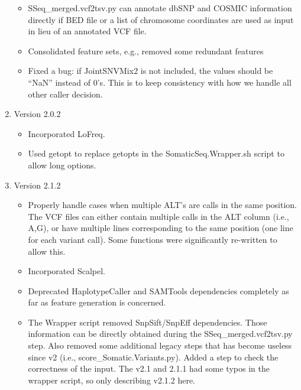 \documentclass[10pt,letterpaper]{article}
\begin{document}
\begin{sloppypar}
\begin{enumerate}
\begin{itemize}
		  \item
		  SSeq\_merged.vcf2tsv.py can annotate dbSNP and COSMIC information directly if BED file or a list of chromosome coordinates are used as input in lieu of an annotated VCF file. 
		
		  \item
		  Consolidated feature sets, e.g., removed some redundant features
		  
		  \item
		  Fixed a bug: if JointSNVMix2 is not included, the values should be ``NaN'' instead of 0's. This is to keep consistency with how we handle all other caller decision.
		\end{itemize}
	
	
	
	\item Version 2.0.2
	
		\begin{itemize}
		
		  \item
		  Incorporated LoFreq.
		  
		  \item
		  Used getopt to replace getopts in the SomaticSeq.Wrapper.sh script to allow long options. 
		  
		\end{itemize}
	
	
	
	\item Version 2.1.2
	
	\begin{itemize}
	
	  \item
	  Properly handle cases when multiple ALT's are calls in the same position. The VCF files can either contain multiple calls in the ALT column (i.e., A,G), or have multiple lines corresponding to the same position (one line for each variant call). Some functions were significantly re-written to allow this.
	
	  \item
	  Incorporated Scalpel.
	  
	  \item
	  Deprecated HaplotypeCaller and SAMTools dependencies completely as far as feature generation is concerned.
	  
	  \item
	  The Wrapper script removed SnpSift/SnpEff dependencies. Those information can be directly obtained during the SSeq\_merged.vcf2tsv.py step. Also removed some additional legacy steps that has become useless since v2 (i.e., score\_Somatic.Variants.py). Added a step to check the correctness of the input. The v2.1 and 2.1.1 had some typos in the wrapper script, so only describing v2.1.2 here.
	

\end{itemize}
\end{enumerate}
\end{sloppypar}
\end{document}
